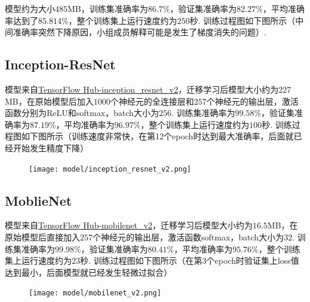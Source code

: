 \documentclass[12pt, a4paper, oneside]{ctexart}
\numberwithin{equation}{section}  %
\begin{document}
模型约为大小$485$MB，训练集准确率为$86.7\%$，验证集准确率为$82.27\%$，平均准确率达到了$85.814\%$，整个训练集上运行速度约为$250$秒. 训练过程图如下图所示（中间准确率突然下降原因，小组成员解释可能是发生了梯度消失的问题）.
\vspace*{-0.5cm}
\begin{figure}[htbp]
  \hspace*{-5.5cm}
  \centering
\end{figure}\vspace*{-1cm}
\subsection{Inception-ResNet}
模型来自\href{https://tfhub.dev/google/imagenet/inception_resnet_v2/classification/5}{TensorFlow Hub-inception\_resnet\_v2}，迁移学习后模型大小约为$227$MB，在原始模型后加入$1000$个神经元的全连接层和$257$个神经元的输出层，激活函数分别为ReLU和softmax，batch大小为$256$. 训练集准确率为$99.58\%$，验证集准确率为$87.19\%$，平均准确率为$96.97\%$，整个训练集上运行速度约为$100$秒. 训练过程图如下图所示（训练速度非常快，在第12个epoch时达到最大准确率，后面就已经开始发生精度下降）\vspace*{-0.3cm}
\begin{figure}[htbp]
  \hspace*{-0.8cm}
  \centering
  \texttt{[image: model/inception\_resnet\_v2.png]}
\end{figure}

\subsection{MoblieNet}
模型来自\href{https://tfhub.dev/google/tf2-preview/mobilenet_v2/classification/4}{TensorFlow Hub-mobilenet\_v2}，迁移学习后模型大小约为$16.5$MB，在原始模型后直接加入$257$个神经元的输出层，激活函数softmax，batch大小为$32$. 训练集准确率为$99.98\%$，验证集准确率为$80.41\%$，平均准确率为$95.76\%$，整个训练集上运行速度约为$23$秒. 训练过程图如下图所示（在第3个epoch时验证集上loss值达到最小，后面模型就已经发生轻微过拟合）\vspace*{-0.3cm}
\begin{figure}[htbp]
  \hspace*{-0.8cm}
  \centering
  \texttt{[image: model/mobilenet\_v2.png]}
\end{figure}
\vspace*{-1cm}
\end{document}
